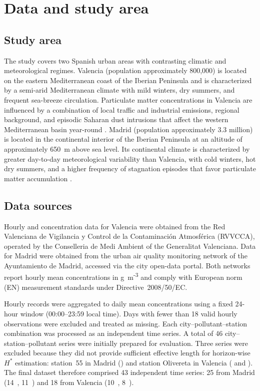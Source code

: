 \documentclass[12pt, a4paper]{article}
\newcommand{\Hstar}{H^{*}}
\begin{document}
\section{Data and study area}
\label{sec:data}
\subsection{Study area}
\label{sec:study_area}

The study covers two Spanish urban areas with contrasting
climatic and meteorological regimes.
Valencia (population approximately 800,000) is located on
the eastern Mediterranean coast of the Iberian Peninsula
and is characterized by a semi-arid Mediterranean climate
with mild winters, dry summers, and frequent sea-breeze
circulation.
Particulate matter concentrations in Valencia are influenced
by a combination of local traffic and industrial emissions,
regional background, and episodic Saharan dust intrusions
that affect the western Mediterranean basin year-round
\citep{Minguillon2015, Pey2013}.
Madrid (population approximately 3.3 million) is located
in the continental interior of the Iberian Peninsula at
an altitude of approximately 650~m above sea level.
Its continental climate is characterized by greater
day-to-day meteorological variability than Valencia,
with cold winters, hot dry summers, and a higher frequency
of stagnation episodes that favor particulate matter
accumulation \citep{Pay2014}.

\subsection{Data sources}
\label{sec:data_sources}

Hourly  and  concentration data for
Valencia were obtained from the Red Valenciana de
Vigilancia y Control de la Contaminaci{\'o}n Atmosf{\'e}rica
(RVVCCA), operated by the Conselleria de Medi Ambient of
the Generalitat Valenciana.
Data for Madrid were obtained from the urban air quality
monitoring network of the Ayuntamiento de Madrid,
accessed via the city open-data portal.
Both networks report hourly mean concentrations in
\textmu g~m\textsuperscript{-3} and comply with
European norm (EN) measurement standards under
Directive~2008/50/EC.

Hourly records were aggregated to daily mean concentrations
using a fixed 24-hour window (00:00--23:59 local time).
Days with fewer than 18 valid hourly observations were
excluded and treated as missing.
Each city--pollutant--station combination was processed
as an independent time series.
A total of 46 city--station--pollutant series were
initially prepared for evaluation.
Three series were excluded because they did not provide
sufficient effective length for horizon-wise $\Hstar$
estimation: station~55 in Madrid () and station
Olivereta in Valencia ( and ).
The final dataset therefore comprised 43 independent
time series: 25 from Madrid (14~,
11~) and 18 from Valencia
(10~, 8~).
\end{document}
